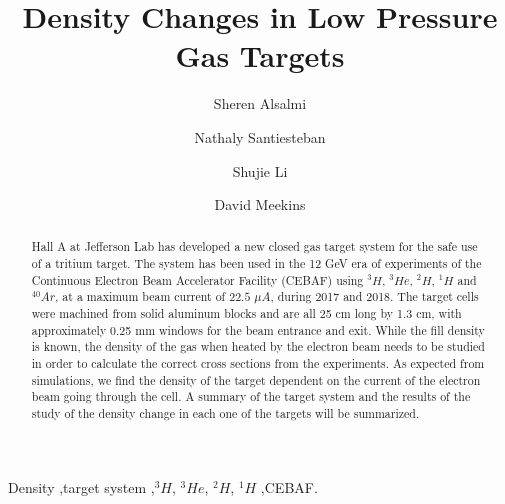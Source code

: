 \documentclass[final,5p,times,twocolumn]{elsarticle}
\begin{document}
\begin{frontmatter}



\title{Density Changes in Low Pressure Gas Targets}

\author[Kent]{Sheren Alsalmi}
\author[UNH]{Nathaly Santiesteban}
\author[UNH]{Shujie Li}
\author[JLab]{David Meekins}

\address[Kent]{Kent State University}
\address[UNH]{University of New Hampshire}
\address[JLab]{Jefferson Lab}

\begin{abstract}

Hall A at Jefferson Lab has developed a new closed gas target system for the safe use of a tritium target. The system has been used in the 12 GeV era of experiments of the Continuous Electron Beam Accelerator Facility (CEBAF) using $^{3}H$, $^{3}He$, $^{2}H$, $^{1}H$ and $^{40}Ar$, at a maximum beam current of 
$22.5$ $\mu A$, during 2017 and 2018. The target cells were machined from solid  aluminum blocks and are all 25 cm long by 1.3 cm, with approximately 0.25 mm  windows for the beam entrance and exit. While the fill density is known, the  density of the gas when heated by the electron beam needs to be studied in 
order to calculate the correct cross sections from the experiments. As expected  from simulations, we find the density of the target dependent on the current of the electron beam going through the cell. A summary of the target system and the results of the study of the density change in each one of the targets will be summarized.

\end{abstract}

\begin{keyword}
Density
\sep target system
\sep $^{3}H$, $^{3}He$, $^{2}H$, $^{1}H$
\sep CEBAF.


\end{keyword}
\end{frontmatter}
\end{document}
